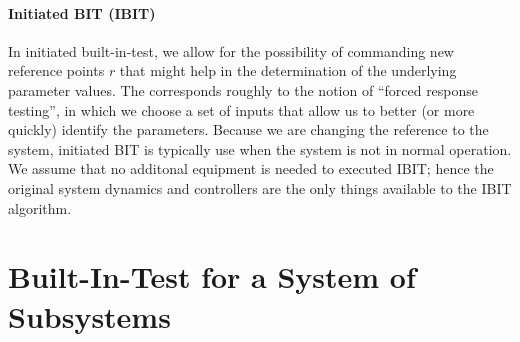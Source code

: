 \documentclass{article}
\begin{document}
\paragraph{Initiated BIT (IBIT)}
In initiated built-in-test, we allow for the possibility of commanding
new reference points $r$ that might help in the determination of the
underlying parameter values.  The corresponds roughly to the notion of
``forced response testing'', in which we choose a set of inputs that
allow us to better (or more quickly) identify the parameters.  Because
we are changing the reference to the system, initiated BIT is
typically use when the system is not in normal operation.  We assume
that no additonal equipment is needed to executed IBIT; hence the
original system dynamics and controllers are the only things available
to the IBIT algorithm.

\section{Built-In-Test for a System of Subsystems}
\end{document}

